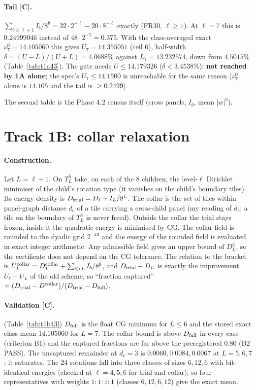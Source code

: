 \documentclass[10pt]{article}
\newcommand{\lab}[1]{\textbf{[#1]}}
\begin{document}
\paragraph{Tail \lab{C}.} $\sum_{b\ge\ell+1}I_b/8^b=32\cdot2^{-\ell}-20\cdot8^{-\ell}$ exactly (FR30, $\ell\ge1$). At $\ell=7$ this is $0.24999046$ instead of $48\cdot2^{-7}=0.375$. With the class-averaged exact $\nu^0_7=14.105060$ this gives $U_7=14.355051$ (ceil 6), half-width $\delta=(U-L)/(U+L)=4.0688\%$ against $L_7=13.232574$, down from $4.5015\%$ (Table~\ref{tab:t1a43}). The gate needs $U\le14.179326$ ($\delta<3.4538\%$): \textbf{not reached by 1A alone}; the spec's $U_7\le14.1500$ is unreachable for the same reason ($\nu^0_7$ alone is $14.105$ and the tail is $\ge0.2499$).


The second table is the Phase 4.2 census itself (cross panels, $I_b$, mean $|w|^2$).

\section{Track 1B: collar relaxation}\label{sec:t1b}
\paragraph{Construction.} Let $L=\ell+1$. On $T_L^h$ take, on each of the 8 children, the level-$\ell$ Dirichlet minimiser of the child's rotation type (it vanishes on the child's boundary tiles). Its energy density is $D_{\rm trial}=D_\ell+I_L/8^L$. The collar is the set of tiles within panel-graph distance $d_c$ of a tile carrying a cross-child panel (my reading of $d_c$; a tile on the boundary of $T_L^h$ is never freed). Outside the collar the trial stays frozen, inside it the quadratic energy is minimised by CG. The collar field is rounded to the dyadic grid $2^{-40}$ and the energy of the rounded field is evaluated in exact integer arithmetic. Any admissible field gives an upper bound of $D_L^h$, so the certificate does not depend on the CG tolerance. The relation to the bracket is $U^{\rm collar}_L=D^{\rm collar}_L+\sum_{b>L}I_b/8^b$, and $D_{\rm trial}-D_L$ is exactly the improvement $U_\ell-U_L$ of the old scheme, so ``fraction captured'' $=(D_{\rm trial}-D^{\rm collar})/(D_{\rm trial}-D_{\rm full})$.

\paragraph{Validation \lab{C}.} (Table~\ref{tab:t1b43}) $D_{\rm full}$ is the float CG minimum for $L\le6$ and the stored exact class mean $14.105060$ for $L=7$. The collar bound is above $D_{\rm full}$ in every case (criterion B1) and the captured fractions are far above the preregistered $0.80$ (B2 PASS). The uncaptured remainder at $d_c=3$ is $0.0060,0.0084,0.0067$ at $L=5,6,7$: it saturates. The 24 rotations fall into three classes of sizes $6,12,6$ with bit-identical energies (checked at $\ell=4,5,6$ for trial and collar), so four representatives with weights $1\!:\!1\!:\!1\!:\!1$ (classes $6,12,6,12$) give the exact mean.


\end{document}
